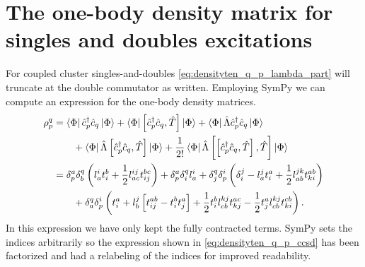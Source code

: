     \section{The one-body density matrix for singles and doubles excitations}
        For coupled cluster singles-and-doubles \autoref{eq:densityten_q_p_lambda_part}
        will truncate at the double commutator as written. Employing
        SymPy\cite{sympy} we can compute an expression for the one-body density
        matrices.
        \begin{align}
            \rho^{q}_{p}
            &= \bra{\Phi}\hat{c}_{p}^{\dagger}\hat{c}_{q}\ket{\Phi}
            + \bra{\Phi}\left[\hat{c}_{p}^{\dagger}\hat{c}_{q}, \hat{T}\right]\ket{\Phi}
            + \bra{\Phi}\hat{\Lambda} \hat{c}_{p}^{\dagger}\hat{c}_{q}\ket{\Phi}
            \nonumber \\
            &\qquad
            + \bra{\Phi}\hat{\Lambda} \left[\hat{c}_{p}^{\dagger}\hat{c}_{q}, \hat{T}\right]\ket{\Phi}
            + \frac{1}{2!}
            \bra{\Phi}\hat{\Lambda} \left[\left[\hat{c}_{p}^{\dagger}\hat{c}_{q}, \hat{T}\right], \hat{T}\right]\ket{\Phi}
            \\
            &=
            \delta^a_p \delta^q_b \left( 
                l^i_a t^b_i + \frac{1}{2} l^{ij}_{ac} t^{bc}_{ij}
             \right)
            + \delta^a_p \delta^q_i l^i_a
            + \delta^q_j \delta^i_p \left( 
                \delta^j_i
                - l^j_a t^a_i
                + \frac{1}{2} l^{jk}_{ab} t^{ab}_{ki}
             \right)
            \nonumber \\
            &\qquad
            + \delta^q_a \delta^i_p \left( 
                t^a_i
                + l^j_b \left[ 
                    t^{ab}_{ij} - t^b_i t^a_j
                 \right]
                + \frac{1}{2} t^{b}_{i} l^{kj}_{cb} t^{ac}_{kj}
                - \frac{1}{2} t^{a}_{j} l^{kj}_{cb} t^{cb}_{ki}
             \right).
            \label{eq:densityten_q_p_ccsd}
        \end{align}
        In this expression we have only kept the fully contracted terms. SymPy
        sets the indices arbitrarily so the expression shown in
        \autoref{eq:densityten_q_p_ccsd} has been factorized and had a relabeling of
        the indices for improved readability.
